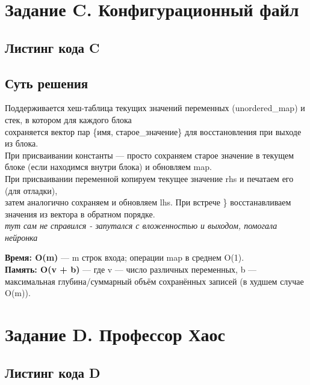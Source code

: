 \documentclass[a4paper,12pt]{article}
\begin{document}
    \section{Задание C. Конфигурационный файл}

    \subsection*{Листинг кода C}
    

    \subsection*{Суть решения}
    Поддерживается хеш-таблица текущих значений переменных (unordered\_map) и стек, в котором для каждого блока\\
    сохраняется вектор пар \{имя, старое\_значение\} для восстановления при выходе из блока.\\
    При присваивании константы — просто сохраняем старое значение в текущем блоке (если находимся внутри блока) и обновляем map.\\
    При присваивании переменной копируем текущее значение rhs и печатаем его (для отладки), \\
    затем аналогично сохраняем и обновляем lhs. При встрече \} восстанавливаем значения из вектора в обратном порядке.
    \\

    \textit{тут сам не справился - запутался с вложенностью и выходом, помогала нейронка}


    \textbf{Время: O(m)} — m строк входа; операции map в среднем O(1).\\
    \textbf{Память: O(v + b)} — где v — число различных переменных, b — максимальная глубина/суммарный объём сохранённых записей (в худшем случае O(m)).


    \newpage


    \section{Задание D. Профессор Хаос}

    \subsection*{Листинг кода D}
    
\end{document}
